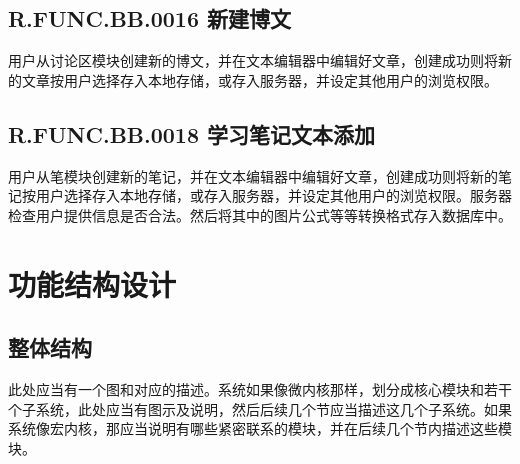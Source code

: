 \subsection{R.FUNC.BB.0016   新建博文}
用户从讨论区模块创建新的博文，并在文本编辑器中编辑好文章，创建成功则将新的文章按用户选择存入本地存储，或存入服务器，并设定其他用户的浏览权限。

\subsection{R.FUNC.BB.0018   学习笔记文本添加}
用户从笔模块创建新的笔记，并在文本编辑器中编辑好文章，创建成功则将新的笔记按用户选择存入本地存储，或存入服务器，并设定其他用户的浏览权限。服务器检查用户提供信息是否合法。然后将其中的图片公式等等转换格式存入数据库中。

\section{功能结构设计}
\subsection{整体结构}
此处应当有一个图和对应的描述。系统如果像微内核那样，划分成核心模块和若干个子系统，此处应当有图示及说明，然后后续几个节应当描述这几个子系统。如果系统像宏内核，那应当说明有哪些紧密联系的模块，并在后续几个节内描述这些模块。

